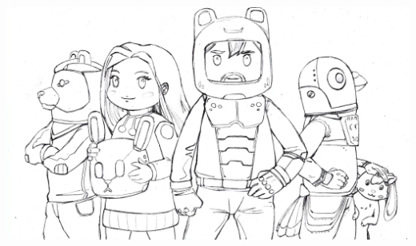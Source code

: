 \documentclass{article}
\newcommand{\bckg}[1]{\AddToShipoutPictureBG*{\texttt{[image: \#1]}}}
\begin{document}
\phantom{;}


\clearpage













\bckg{Assets/diejager_space_bw}
\vspace*{\fill}
\includegraphics[width=.7\paperwidth]{Assets/cosmoose_cover_drawz}
\end{document}
